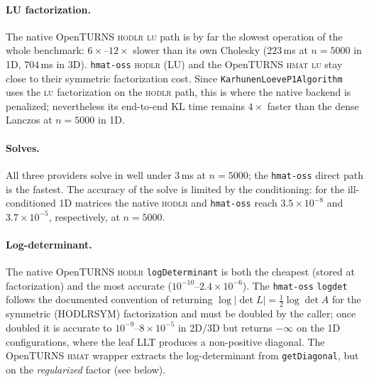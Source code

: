 \documentclass[11pt]{article}
\newcommand{\ot}{OpenTURNS}
\begin{document}
\paragraph{LU factorization.}
The native \ot{} \textsc{hodlr} \textsc{lu} path is by far the slowest
operation of the whole benchmark: $6\times$--$12\times$ slower than its own
Cholesky ($223$\,ms at $n=5000$ in 1D, $704$\,ms in 3D).  \texttt{hmat-oss}
\textsc{hodlr} (LU) and the \ot{} \textsc{hmat} \textsc{lu} stay close to their
symmetric factorization cost.  Since \texttt{KarhunenLoeveP1Algorithm} uses the
\textsc{lu} factorization on the \textsc{hodlr} path, this is where the native
backend is penalized; nevertheless its end-to-end KL time remains $4\times$
faster than the dense Lanczos at $n=5000$ in 1D.

\paragraph{Solves.}
All three providers solve in well under $3$\,ms at $n=5000$; the 
\texttt{hmat-oss} direct path is the fastest.  The accuracy of the solve is
limited by the conditioning: for the ill-conditioned 1D matrices the native
\textsc{hodlr} and \texttt{hmat-oss} reach $3.5\times10^{-8}$ and
$3.7\times10^{-5}$, respectively, at $n=5000$.

\paragraph{Log-determinant.}
The native \ot{} \textsc{hodlr} \texttt{logDeterminant} is both the cheapest
(stored at factorization) and the most accurate ($10^{-10}$--$2.4\times10^{-6}$).
The \texttt{hmat-oss} \texttt{logdet} follows the documented convention of
returning $\log|\det L|=\frac12\log\det A$ for the symmetric (HODLRSYM)
factorization and must be doubled by the caller; once doubled it is accurate to
$10^{-9}$--$8\times10^{-5}$ in 2D/3D but returns $-\infty$ on the 1D
configurations, where the leaf LLT produces a non-positive diagonal.  The \ot{}
\textsc{hmat} wrapper extracts the log-determinant from
\texttt{getDiagonal}, but on the \emph{regularized} factor (see below).
\end{document}
